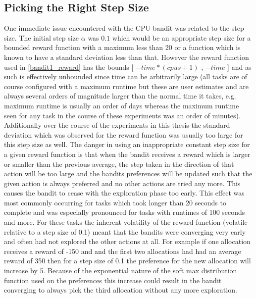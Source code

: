 \subsection{Picking the Right Step Size}
\label{sub:const_stepsize}
One immediate issue encountered with the CPU bandit was related to the step size. The initial step size $\alpha$ was $0.1$ which would be an appropriate step size for a bounded reward function with a maximum less than 20 or a function which is known to have a standard deviation less than that. However the reward function used in \ref{bandit1_reward} has the bounds [ $-time*(cpus+1)$ , $-time$ ] and as such is effectively unbounded since time can be arbitrarily large (all tasks are of course configured with a maximum runtime but these are user estimates and are always several orders of magnitude larger than the normal time it takes, e.g. maximum runtime is usually an order of days whereas the maximum runtime seen for any task in the course of these experiments was an order of minutes). Additionally over the course of the experiments in this thesis the standard deviation which was observed for the reward function was usually too large for this step size as well.  The danger in using an inappropriate constant step size for a given reward function is that when the bandit receives a reward which is larger or smaller than the previous average, the step taken in the direction of that action will be too large and the bandits preferences will be updated such that the given action is always preferred and no other actions are tried any more. This causes the bandit to cease with the exploration phase too early. This effect was most commonly occurring for tasks which took longer than 20 seconds to complete and was especially pronounced for tasks with runtimes of 100 seconds and more.  For these tasks the inherent volatility of the reward function (volatile relative to a step size of 0.1) meant that the bandits were converging very early and often had not explored the other actions at all. For example if one allocation receives a reward of -150 and and the first two allocations had had an average reward of 350 then for a step size of 0.1 the preference for the new allocation will increase by 5. Because of the exponential nature of the soft max distribution function used on the preferences this increase could result in the bandit converging to always pick the third allocation without any more exploration. 


